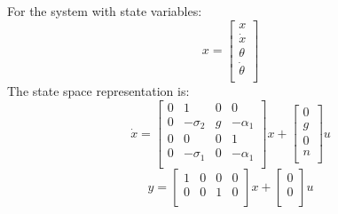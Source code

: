 For the system with state variables:\begin{equation}
x = 
\begin{bmatrix}
x\\
\dot x\\
\theta\\
\dot \theta\\
\end{bmatrix}\end{equation}The state space representation is: \begin{equation}
\dot x = \begin{bmatrix}
0&1&0&0\\0&-\sigma_2&g&-\alpha_1\\0&0&0&1\\0&-\sigma_1&0&-\alpha_1\\\end{bmatrix}
x + \begin{bmatrix}
0\\g\\0\\n\\\end{bmatrix}
u
\end{equation}
\begin{equation}
y = \begin{bmatrix}
1&0&0&0\\0&0&1&0\\\end{bmatrix}
x + \begin{bmatrix}
0\\0\\\end{bmatrix}
u
\end{equation}
